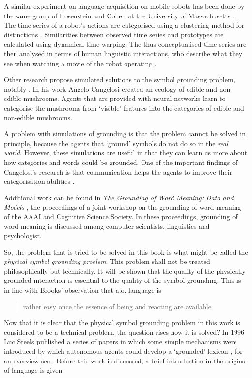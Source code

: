 A similar experiment on language acquisition on mobile robots has been done by the same group of Rosenstein and Cohen at the University of Massachusetts \citep{oatesetal:1999}. The time series of a robot's actions are categorised using a clustering method for distinctions \citep{oates:1999}. Similarities between observed time series and prototypes are calculated using dynamical time warping. The thus conceptualised time series are then analysed in terms of human linguistic interactions, who describe what they see when watching a movie of the robot operating \citep{oatesetal:1999}.


Other research propose simulated solutions to the symbol grounding problem, notably \citep{cangelosiparisi:1998,cangelosi:1998}. In his work Angelo Cangelosi created an ecology of edible and non-edible mushrooms. Agents that are provided with neural networks learn to categorise the mushrooms from `visible' features into the categories of edible and non-edible mushrooms.

A problem with simulations of grounding is that the problem cannot be solved in principle, because the agents that `ground' symbols do not do so in the {\em real world}. However, these simulations are useful in that they can learn us more about how categories and words could be grounded.  One of the important findings of Cangelosi's research is that communication helps the agents to improve their categorisation abilities \citep{cangelosiharnad:2000}.

Additional work can be found in {\em The Grounding of Word Meaning: Data and Models} \citep{gasser:1998}, the proceedings of a joint workshop on the grounding of word meaning of the AAAI and Cognitive Science Society. In these proceedings, grounding of word meaning is discussed among computer scientists, linguistics and psychologist. 


So, the problem that is tried to be solved in this book is what might be called the {\em physical symbol grounding problem}. This problem shall not be treated philosophically but technically. It will be shown that the quality of the physically grounded interaction is essential to the quality of the symbol grounding. This is in line with Brooks' observation that a.o. language is 

\begin{quote}
rather easy once the essence of being and reacting are available. \citep{brooks:1990}
\end{quote}

Now that it is clear that the physical symbol grounding problem in this work is considered to be a technical problem, the question rises how it is solved? In 1996 Luc Steels published a series of papers in which some simple mechanisms were introduced by which autonomous agents could develop a `grounded' lexicon \citep{steels:1996a,steels:1996b,steels:1996d,steels:1996e}, for an overview see \citep{steels:1997b}. Before this work is discussed, a brief introduction in the origins of language is given.

